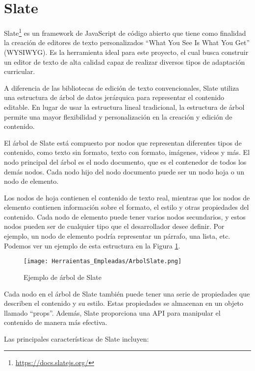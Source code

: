 
\section{Slate}\label{sec:Slate}
Slate\footnote{\url{https://docs.slatejs.org/}} es un framework de JavaScript de código abierto que tiene como finalidad la creación de editores de texto personalizados ``What You See Is What You Get'' (WYSIWYG). Es la herramienta ideal para este proyecto, el cual busca construir un editor de texto de alta calidad capaz de realizar diversos tipos de adaptación curricular.

A diferencia de las bibliotecas de edición de texto convencionales, Slate utiliza una estructura de árbol de datos jerárquica para representar el contenido editable. En lugar de usar la estructura lineal tradicional, la estructura de árbol permite una mayor flexibilidad y personalización en la creación y edición de contenido.

El árbol de Slate está compuesto por nodos que representan diferentes tipos de contenido, como texto sin formato, texto con formato, imágenes, videos y más. El nodo principal del árbol es el nodo documento, que es el contenedor de todos los demás nodos. Cada nodo hijo del nodo documento puede ser un nodo hoja o un nodo de elemento.

Los nodos de hoja contienen el contenido de texto real, mientras que los nodos de elemento contienen información sobre el formato, el estilo y otras propiedades del contenido. Cada nodo de elemento puede tener varios nodos secundarios, y estos nodos pueden ser de cualquier tipo que el desarrollador desee definir. Por ejemplo, un nodo de elemento podría representar un párrafo, una lista, etc. Podemos ver un ejemplo de esta estructura en la Figura \ref{fig:arbolSlate}.

\begin{figure}[ht!]
  \centering
  \texttt{[image: Herraientas\_Empleadas/ArbolSlate.png]}
  \caption{Ejemplo de árbol de Slate}
  \label{fig:arbolSlate}
\end{figure}

Cada nodo en el árbol de Slate también puede tener una serie de propiedades que describen el contenido y su estilo. Estas propiedades se almacenan en un objeto llamado ``props''. Además, Slate proporciona una API para manipular el contenido de manera más efectiva.

Las principales características de Slate incluyen:

